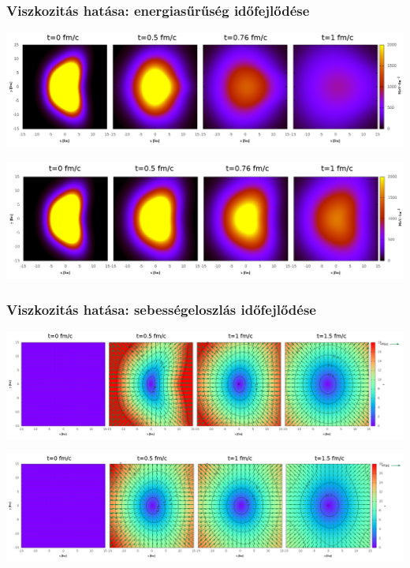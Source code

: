 \documentclass{beamer}
\begin{document}
\begin{frame}
\frametitle{Viszkozitás hatása: energiasűrűség időfejlődése}
\begin{minipage}{0.04\textwidth}
\end{minipage}
\begin{minipage}{0.95\textwidth}
\begin{center}
    \includegraphics[scale=0.19]{pic/res/nonrel/anim/ev0}

    \includegraphics[scale=0.19]{pic/res/nonrel/anim/ev10}
\end{center}
\end{minipage}
\end{frame}
\begin{frame}
\frametitle{Viszkozitás hatása:  sebességeloszlás időfejlődése}
\begin{minipage}{0.04\textwidth}
\end{minipage}
\begin{minipage}{0.95\textwidth}
\begin{center}
    \includegraphics[scale=0.15]{pic/res/nonrel/anim/vv0}

    \includegraphics[scale=0.15]{pic/res/nonrel/anim/vv10}
\end{center}
\end{minipage}
\end{frame}
\end{document}
